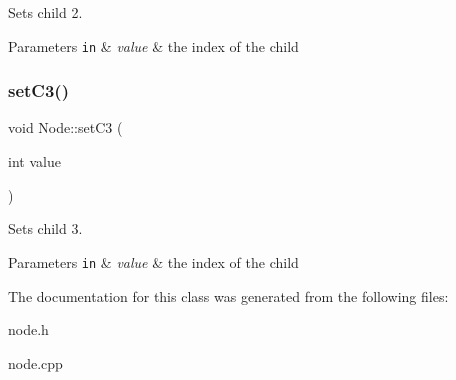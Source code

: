 Sets child 2. 


\begin{DoxyParams}[1]{Parameters}
\mbox{\tt in}  & {\em value} & the index of the child \\
\hline
\end{DoxyParams}
\mbox{\label{classNode_a36d0038efe7fae34655f5c360008da6f}} 
\subsubsection{\texorpdfstring{set\+C3()}{setC3()}}
{\footnotesize\ttfamily void Node\+::set\+C3 (\begin{DoxyParamCaption}\item[{int}]{value }\end{DoxyParamCaption})}



Sets child 3. 


\begin{DoxyParams}[1]{Parameters}
\mbox{\tt in}  & {\em value} & the index of the child \\
\hline
\end{DoxyParams}


The documentation for this class was generated from the following files\+:\begin{DoxyCompactItemize}
\item 
node.\+h\item 
node.\+cpp\end{DoxyCompactItemize}
